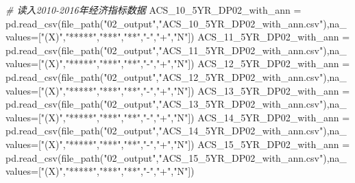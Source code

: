 \documentclass[
]{article}
\newenvironment{Shaded}{}{}
\newcommand{\CommentTok}[1]{\textcolor[rgb]{0.38,0.63,0.69}{\textit{#1}}}
\newcommand{\NormalTok}[1]{#1}
\newcommand{\OperatorTok}[1]{\textcolor[rgb]{0.40,0.40,0.40}{#1}}
\newcommand{\StringTok}[1]{\textcolor[rgb]{0.25,0.44,0.63}{#1}}
\begin{document}
\begin{Shaded}
\begin{Highlighting}[]
\CommentTok{\# 读入2010{-}2016年经济指标数据}
\NormalTok{ACS\_10\_5YR\_DP02\_with\_ann }\OperatorTok{=}\NormalTok{ pd.read\_csv(file\_path(}\StringTok{"02\_output"}\NormalTok{,}\StringTok{"ACS\_10\_5YR\_DP02\_with\_ann.csv"}\NormalTok{),na\_values}\OperatorTok{=}\NormalTok{[}\StringTok{"(X)"}\NormalTok{,}\StringTok{"*****"}\NormalTok{,}\StringTok{"***"}\NormalTok{,}\StringTok{"**"}\NormalTok{,}\StringTok{"{-}"}\NormalTok{,}\StringTok{"+"}\NormalTok{,}\StringTok{"N"}\NormalTok{])}
\NormalTok{ACS\_11\_5YR\_DP02\_with\_ann }\OperatorTok{=}\NormalTok{ pd.read\_csv(file\_path(}\StringTok{"02\_output"}\NormalTok{,}\StringTok{"ACS\_11\_5YR\_DP02\_with\_ann.csv"}\NormalTok{),na\_values}\OperatorTok{=}\NormalTok{[}\StringTok{"(X)"}\NormalTok{,}\StringTok{"*****"}\NormalTok{,}\StringTok{"***"}\NormalTok{,}\StringTok{"**"}\NormalTok{,}\StringTok{"{-}"}\NormalTok{,}\StringTok{"+"}\NormalTok{,}\StringTok{"N"}\NormalTok{])}
\NormalTok{ACS\_12\_5YR\_DP02\_with\_ann }\OperatorTok{=}\NormalTok{ pd.read\_csv(file\_path(}\StringTok{"02\_output"}\NormalTok{,}\StringTok{"ACS\_12\_5YR\_DP02\_with\_ann.csv"}\NormalTok{),na\_values}\OperatorTok{=}\NormalTok{[}\StringTok{"(X)"}\NormalTok{,}\StringTok{"*****"}\NormalTok{,}\StringTok{"***"}\NormalTok{,}\StringTok{"**"}\NormalTok{,}\StringTok{"{-}"}\NormalTok{,}\StringTok{"+"}\NormalTok{,}\StringTok{"N"}\NormalTok{])}
\NormalTok{ACS\_13\_5YR\_DP02\_with\_ann }\OperatorTok{=}\NormalTok{ pd.read\_csv(file\_path(}\StringTok{"02\_output"}\NormalTok{,}\StringTok{"ACS\_13\_5YR\_DP02\_with\_ann.csv"}\NormalTok{),na\_values}\OperatorTok{=}\NormalTok{[}\StringTok{"(X)"}\NormalTok{,}\StringTok{"*****"}\NormalTok{,}\StringTok{"***"}\NormalTok{,}\StringTok{"**"}\NormalTok{,}\StringTok{"{-}"}\NormalTok{,}\StringTok{"+"}\NormalTok{,}\StringTok{"N"}\NormalTok{])}
\NormalTok{ACS\_14\_5YR\_DP02\_with\_ann }\OperatorTok{=}\NormalTok{ pd.read\_csv(file\_path(}\StringTok{"02\_output"}\NormalTok{,}\StringTok{"ACS\_14\_5YR\_DP02\_with\_ann.csv"}\NormalTok{),na\_values}\OperatorTok{=}\NormalTok{[}\StringTok{"(X)"}\NormalTok{,}\StringTok{"*****"}\NormalTok{,}\StringTok{"***"}\NormalTok{,}\StringTok{"**"}\NormalTok{,}\StringTok{"{-}"}\NormalTok{,}\StringTok{"+"}\NormalTok{,}\StringTok{"N"}\NormalTok{])}
\NormalTok{ACS\_15\_5YR\_DP02\_with\_ann }\OperatorTok{=}\NormalTok{ pd.read\_csv(file\_path(}\StringTok{"02\_output"}\NormalTok{,}\StringTok{"ACS\_15\_5YR\_DP02\_with\_ann.csv"}\NormalTok{),na\_values}\OperatorTok{=}\NormalTok{[}\StringTok{"(X)"}\NormalTok{,}\StringTok{"*****"}\NormalTok{,}\StringTok{"***"}\NormalTok{,}\StringTok{"**"}\NormalTok{,}\StringTok{"{-}"}\NormalTok{,}\StringTok{"+"}\NormalTok{,}\StringTok{"N"}\NormalTok{])}

\end{Highlighting}
\end{Shaded}
\end{document}
